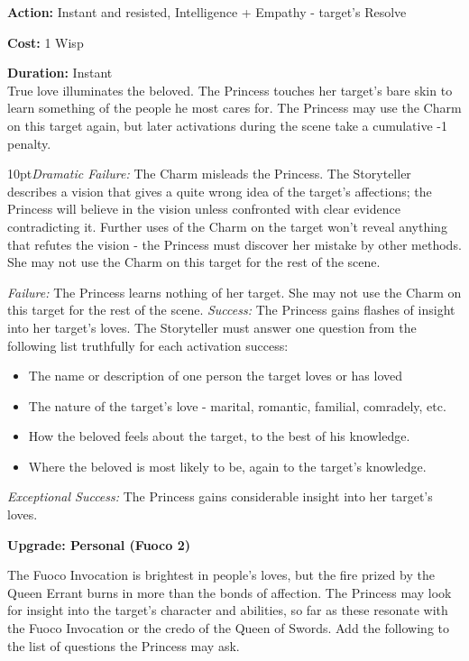 \noindent \textbf{Action:} Instant and resisted, Intelligence + Empathy - target's Resolve

\noindent \textbf{Cost:} 1 Wisp

\noindent \textbf{Duration:} Instant\\

\noindent True love illuminates the beloved. The Princess touches her target's bare skin to learn something of the people he most cares for. The Princess may use the Charm on this target again, but later activations during the scene take a cumulative -1 penalty.

\begin{myindentpar}{10pt}\emph{Dramatic Failure:} The Charm misleads the Princess. The Storyteller describes a vision that gives a quite wrong idea of the target's affections; the Princess will believe in the vision unless confronted with clear evidence contradicting it. Further uses of the Charm on the target won't reveal anything that refutes the vision - the Princess must discover her mistake by other methods. She may not use the Charm on this target for the rest of the scene.


\emph{Failure:} The Princess learns nothing of her target. She may not use the Charm on this target for the rest of the scene.
\emph{Success:} The Princess gains flashes of insight into her target's loves. The Storyteller must answer one question from the following list truthfully for each activation success:

\begin{itemize}
\item The name or description of one person the target loves or has loved
\item The nature of the target's love - marital, romantic, familial, comradely, etc.
\item How the beloved feels about the target, to the best of his knowledge.
\item Where the beloved is most likely to be, again to the target's knowledge.
\end{itemize}

\emph{Exceptional Success:} The Princess gains considerable insight into her target's loves.

\textbf{Upgrade: Personal (Fuoco 2)}

The Fuoco Invocation is brightest in people's loves, but the fire prized by the Queen Errant burns in more than the bonds of affection. The Princess may look for insight into the target's character and abilities, so far as these resonate with the Fuoco Invocation or the credo of the Queen of Swords. Add the following to the list of questions the Princess may ask.


\end{myindentpar}
